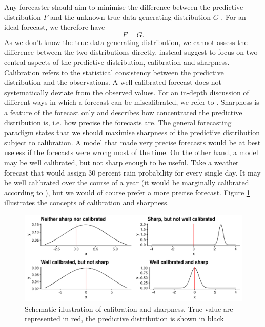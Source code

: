 \documentclass[article,shortnames]{jss}
\begin{document}
Any forecaster should aim to minimise the difference between the predictive distribution $F$ and the unknown true data-generating distribution $G$ \citep{gneitingProbabilisticForecastsCalibration2007}. For an ideal forecast, we therefore have 
%
$$ F = G. $$
%
As we don't know the true data-generating distribution, we cannot assess the difference between the two distributions directly. \cite{gneitingProbabilisticForecastsCalibration2007} instead suggest to focus on two central aspects of the predictive distribution, calibration and sharpness. Calibration refers to the statistical consistency between the predictive distribution and the observations. A well calibrated forecast does not systematically deviate from the observed values. For an in-depth discussion of different ways in which a forecast can be miscalibrated, we refer to \cite{gneitingProbabilisticForecastsCalibration2007}. Sharpness is a feature of the forecast only and describes how concentrated the predictive distribution is, i.e. how precise the forecasts are. The general forecasting paradigm states that we should maximise sharpness of the predictive distribution subject to calibration. A model that made very precise forecasts would be at best useless if the forecasts were wrong most of the time. On the other hand, a model may be well calibrated, but not sharp enough to be useful. Take a weather forecast that would assign 30 percent rain probability for every single day. It may be well calibrated over the course of a year (it would be marginally calibrated according to \cite{gneitingProbabilisticForecastsCalibration2007}), but we would of course prefer a more precise forecast. Figure \ref{fig:forecast-paradigm} illustrates the concepts of calibration and sharpness. 

\begin{figure}[h]
\centering
\includegraphics{plots/forecast-paradigm.png}
\caption{\label{fig:forecast-paradigm} Schematic illustration of calibration and sharpness. True value are represented in red, the predictive distribution is shown in black}
\end{figure}
\end{document}
